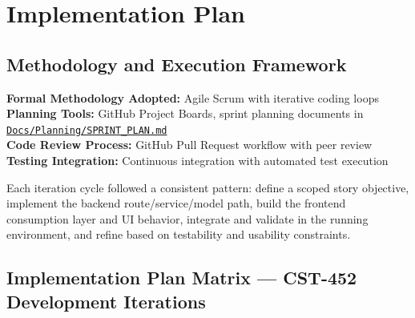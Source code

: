 \documentclass[12pt,letterpaper]{article}
\newcommand{\ghrepo}{https://github.com/omniV1/lunaraCare}
\begin{document}
\section{Implementation Plan}

\subsection{Methodology and Execution Framework}

\textbf{Formal Methodology Adopted:} Agile Scrum with iterative coding loops\\
\textbf{Planning Tools:} GitHub Project Boards, sprint planning documents in \href{\ghrepo/blob/main/Docs/Planning/SPRINT_PLAN.md}{\texttt{Docs/Planning/SPRINT\_PLAN.md}}\\
\textbf{Code Review Process:} GitHub Pull Request workflow with peer review\\
\textbf{Testing Integration:} Continuous integration with automated test execution

Each iteration cycle followed a consistent pattern: define a scoped story objective, implement the backend route/service/model path, build the frontend consumption layer and UI behavior, integrate and validate in the running environment, and refine based on testability and usability constraints.

\subsection{Implementation Plan Matrix --- CST-452 Development Iterations}
\end{document}
